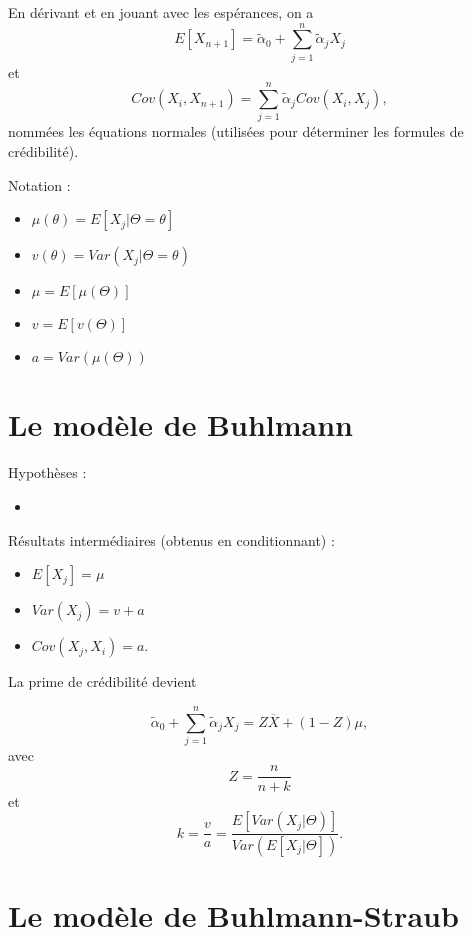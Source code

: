 En dérivant et en jouant avec les espérances, on a 
$$E[X_{n+1}] = \tilde{\alpha}_0 + \sum_{j = 1}^{n}\tilde{\alpha}_j X_j$$
et
$$Cov(X_i, X_{n+1}) = \sum_{j = 1}^{n}\tilde{\alpha}_j Cov(X_i, X_j),$$
nommées les équations normales (utilisées pour déterminer les formules de crédibilité). 

Notation : 

\begin{multicols}{2}
	\begin{itemize}
		\item $\displaystyle \mu(\theta) = E[X_j \vert \Theta = \theta]$
		\item $\displaystyle v(\theta) = Var(X_j \vert \Theta = \theta)$
		\columnbreak
		\item $\displaystyle \mu = E[\mu(\Theta)]$
		\item $\displaystyle v = E[v(\Theta)]$
		\item $\displaystyle a = Var(\mu(\Theta))$
	\end{itemize}
\end{multicols}

\section{Le modèle de Buhlmann}

Hypothèses : 

\begin{itemize}
	\item 
\end{itemize}

Résultats intermédiaires (obtenus en conditionnant) :

\begin{itemize}
	\item $\displaystyle E[X_j] = \mu$
	\item $\displaystyle Var(X_j) = v + a$
	\item $\displaystyle Cov(X_j, X_i) = a$.
\end{itemize}

La prime de crédibilité devient

$$\tilde{\alpha}_0 + \sum_{j = 1}^{n}\tilde{\alpha}_jX_j = Z\overline{X} + (1-Z)\mu,$$
avec
$$Z = \frac{n}{n + k}$$
et
$$k = \frac{v}{a} = \frac{E[Var(X_j \vert \Theta)]}{Var(E[X_j \vert \Theta])}.$$

\section{Le modèle de Buhlmann-Straub}


